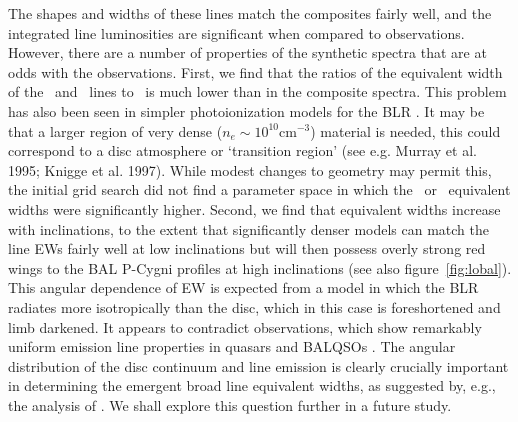 \documentclass[useAMS,usenatbib]{mn2e_x}
\begin{document}
The shapes and widths of these lines
match the composites fairly well, and the integrated 
line luminosities are significant when compared to observations.
However, there are a number of properties of the synthetic spectra
that are at odds with the observations. First, we find that the ratios of the 
equivalent width of the \la\ and \mg\ lines
to \civ\ is much lower than in the composite spectra. This problem 
has also been seen in simpler photoionization models for the BLR \citep{netzer1990}.
It may be that a larger region of very dense ($n_e\sim10^{10}$cm$^{-3}$) 
material is needed, this could correspond to a disc atmosphere or 
`transition region' (see e.g. Murray et al. 1995; Knigge et al. 1997). 
While modest changes to geometry may permit this, the initial grid search 
did not find a parameter space in which the \la\ or \mg\ equivalent widths
were significantly higher. Second, we find that equivalent widths increase
with inclinations, to the extent that significantly denser
models can match the line EWs fairly well at low inclinations but will then
possess overly strong red wings to the BAL P-Cygni profiles at high inclinations
(see also figure~\ref{fig:lobal}).
This angular dependence of EW is expected from a model in which the BLR radiates
more isotropically than the disc, which in this case is foreshortened and limb darkened.
It appears to contradict observations, which show remarkably uniform emission
line properties in quasars and BALQSOs \citep{weymann1991,dipompeo2012b}. 
The angular distribution of the disc 
continuum and line emission
is clearly crucially important in determining the emergent broad 
line equivalent widths, as suggested by, e.g., the analysis of \cite{risaliti2011}. 
We shall explore this question further in a future study.  
\end{document}
